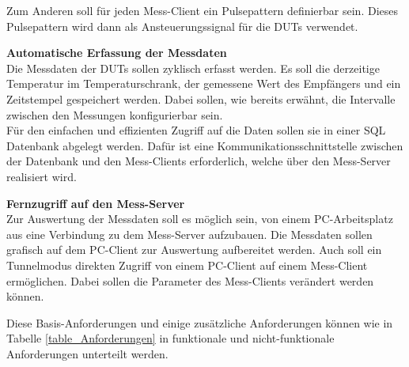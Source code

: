 Zum Anderen soll für jeden Mess-Client ein Pulsepattern definierbar sein. Dieses Pulsepattern wird dann als Ansteuerungssignal für die \acp{DUT} verwendet.

\textbf{Automatische Erfassung der Messdaten}\\
Die Messdaten der \acp{DUT} sollen zyklisch erfasst werden. Es soll die derzeitige Temperatur im Temperaturschrank, der gemessene Wert des Empfängers und ein Zeitstempel gespeichert werden. Dabei sollen, wie bereits erwähnt, die Intervalle zwischen den Messungen konfigurierbar sein.\\
Für den einfachen und effizienten Zugriff auf die Daten sollen sie in einer \ac{SQL} Datenbank abgelegt werden. Dafür ist eine Kommunikationsschnittstelle zwischen der Datenbank und den Mess-Clients erforderlich, welche über den Mess-Server realisiert wird.

\textbf{Fernzugriff auf den Mess-Server}\\
Zur Auswertung der Messdaten soll es möglich sein, von einem PC-Arbeitsplatz aus eine Verbindung zu dem Mess-Server aufzubauen. Die Messdaten sollen grafisch auf dem PC-Client zur Auswertung aufbereitet werden.
Auch soll ein Tunnelmodus direkten Zugriff von einem PC-Client auf einem Mess-Client ermöglichen. Dabei sollen die Parameter des Mess-Clients verändert werden können.

Diese Basis-Anforderungen und einige zusätzliche Anforderungen können wie in Tabelle \ref{table_Anforderungen} in funktionale und nicht-funktionale Anforderungen unterteilt werden.


